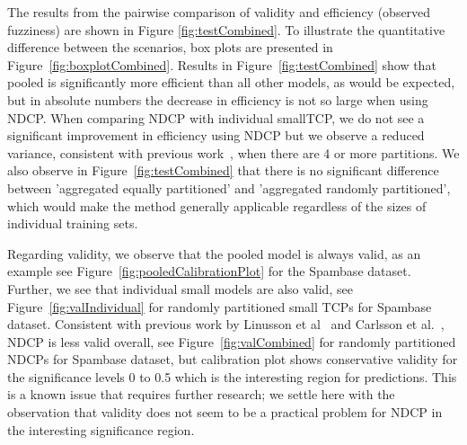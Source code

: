 \documentclass[preprint,12pt,authoryear]{elsarticle}
\begin{document}
The results from the pairwise comparison of validity and efficiency (observed fuzziness) are shown in Figure \ref{fig:testCombined}. To illustrate the quantitative difference between the scenarios, box plots are presented in Figure~\ref{fig:boxplotCombined}.
%
Results in Figure~\ref{fig:testCombined} show that pooled is significantly more efficient than all other models, as would be expected, but in absolute numbers the decrease in efficiency is not so large when using NDCP. When comparing NDCP with individual smallTCP, we do not see a significant improvement in efficiency using NDCP but we observe a reduced variance, consistent with previous work~\citep{Carlsson:2014qr}, when there are 4 or more partitions. We also observe in Figure~\ref{fig:testCombined} that there is no significant difference between 'aggregated equally partitioned' and 'aggregated randomly partitioned', which would make the method generally applicable regardless of the sizes of individual training sets.


Regarding validity, we observe that the pooled model is always valid, as an example see Figure~\ref{fig:pooledCalibrationPlot} for the Spambase dataset. Further, we see that individual small models are also valid, see Figure~\ref{fig:valIndividual} for randomly partitioned small TCPs for Spambase dataset. Consistent with previous work by Linusson et al~\cite{Linusson:2017dn} and Carlsson et al.~\cite{Carlsson:2014qr}, NDCP is less valid overall, see Figure~\ref{fig:valCombined} for randomly partitioned NDCPs for Spambase dataset, but calibration plot shows conservative validity for the significance levels 0 to 0.5 which is the interesting region for predictions. This is a known issue that requires further research; we settle here with the observation that validity does not seem to be a practical problem for NDCP in the interesting significance region.
\end{document}
